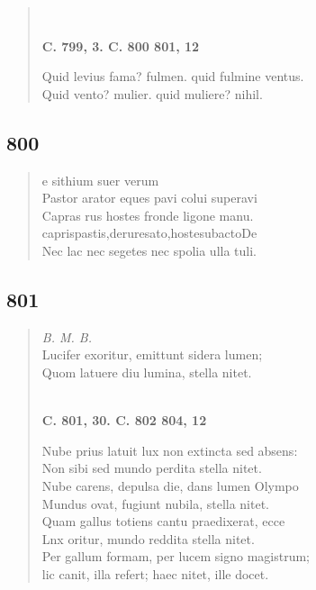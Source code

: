 \documentclass[11pt, a4paper]{report}
\begin{document}
\begin{verse}
        ﻿\pagebreak 
    \begin{center} \textbf{C. 799, 3. C. 800 801, 12} \end{center} \marginpar{[276]} Quid levius fama? fulmen. quid fulmine ventus. \\ Quid vento? mulier. quid muliere? nihil. \\ 
      \end{verse}
  
            \subsection*{800}
      \begin{verse}
      e sithium suer verum \\ Pastor arator eques pavi colui superavi \\ Capras rus hostes fronde ligone manu. \\ caprispastis,deruresato,hostesubactoDe \\ Nec lac nec segetes nec spolia ulla tuli. \\ 
      \end{verse}
  
            \subsection*{801}
      \begin{verse}
      \textit{B. M. B.} \\ Lucifer exoritur, emittunt sidera lumen; \\ Quom latuere diu lumina, stella nitet. \\ 
        ﻿\pagebreak 
    \begin{center} \textbf{C. 801, 30. C. 802 804, 12} \end{center} \marginpar{[277]} Nube prius latuit lux non extincta sed absens: \\ Non sibi sed mundo perdita stella nitet. \\ Nube carens, depulsa die, dans lumen Olympo \\ Mundus ovat, fugiunt nubila, stella nitet. \\ Quam gallus totiens cantu praedixerat, ecce \\ Lnx oritur, mundo reddita stella nitet. \\ Per gallum formam, per lucem signo magistrum; \\ lic canit, illa refert; haec nitet, ille docet. \\ 
      \end{verse}
  
\end{document}
